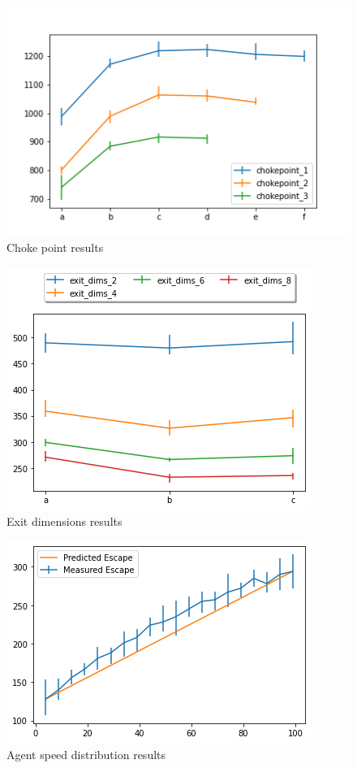 \documentclass[12pt,letterpaper]{article}
\begin{document}
\begin{figure} 
  \centering
  \includegraphics[width=.9\linewidth]{./figures/chokepoint_graph.png}
  \caption{Choke point results}
  \label{fig:chokepointResults}
\end{figure}
\begin{figure}
  \centering
  \includegraphics[width=.75\linewidth]{./figures/exit_dims_graph.png}
  \caption{Exit dimensions results}
\end{figure}

\begin{figure}
  \centering
  \includegraphics[width=.75\linewidth]{./figures/speed_dist_test.png}
  \caption{Agent speed distribution results}
\end{figure}
\end{document}
